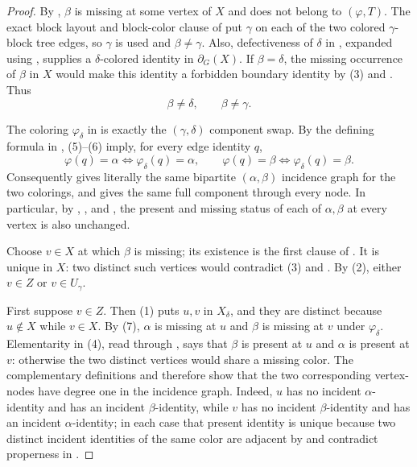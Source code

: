 \begin{proof}
By , $\beta$ is missing at some vertex of $X$ and
does not belong to $(\varphi,T)$.  The exact block
layout and block-color clause of
 put $\gamma$ on each of the two
colored $\gamma$-block tree edges, so $\gamma$ is used and
$\beta\ne\gamma$.  Also, defectiveness of $\delta$ in
, expanded using
, supplies a $\delta$-colored identity in
$\partial_G(X)$.  If $\beta=\delta$, the missing occurrence of $\beta$ in
$X$ would make this identity a forbidden boundary identity by (3) and
.  Thus
\[
 \beta\ne\delta,\qquad \beta\ne\gamma.                     \tag{6}
\]

The coloring $\varphi_\delta$ in
 is exactly the
$(\gamma,\delta)$ component swap.  By the defining formula in
, (5)--(6) imply, for every edge identity
$q$,
\[
 \varphi(q)=\alpha\Longleftrightarrow
 \varphi_\delta(q)=\alpha,
 \qquad
 \varphi(q)=\beta\Longleftrightarrow
 \varphi_\delta(q)=\beta.                                  \tag{7}
\]
Consequently  gives literally the same
bipartite $(\alpha,\beta)$ incidence graph for the two colorings, and
 gives the same full component through every
node.  In particular, by ,
, and , the present and
missing status of each of $\alpha,\beta$ at every vertex is also unchanged.

Choose $v\in X$ at which $\beta$ is missing; its existence is the first
clause of .  It is unique in $X$: two distinct such
vertices would contradict (3) and
.  By (2), either $v\in Z$ or
$v\in U_\gamma$.

First suppose $v\in Z$.  Then (1) puts $u,v$ in $X_\delta$, and they are
distinct because $u\notin X$ while $v\in X$.  By (7), $\alpha$ is missing
at $u$ and $\beta$ is missing at $v$ under $\varphi_\delta$.  Elementarity
in (4), read through , says that
$\beta$ is present at $u$ and $\alpha$ is present at $v$: otherwise the
two distinct vertices would share a missing color.  The complementary
definitions  and  therefore
show that the two corresponding vertex-nodes have degree one in the
incidence graph.  Indeed, $u$ has no incident $\alpha$-identity and has an
incident $\beta$-identity, while $v$ has no incident $\beta$-identity and
has an incident $\alpha$-identity; in each case that present identity is
unique because two distinct incident identities of the same color are
adjacent by  and contradict properness in
.


\end{proof}
